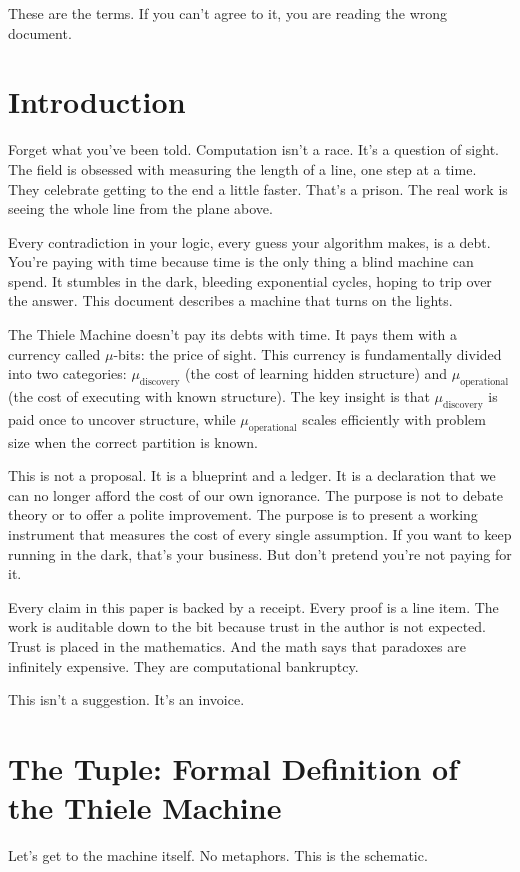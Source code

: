 \documentclass[11pt]{article}
\begin{document}
These are the terms. If you can't agree to it, you are reading the wrong document.

\section{Introduction}
Forget what you've been told. Computation isn't a race. It's a question of sight. The field is obsessed with measuring the length of a line, one step at a time. They celebrate getting to the end a little faster. That's a prison. The real work is seeing the whole line from the plane above.

Every contradiction in your logic, every guess your algorithm makes, is a debt. You're paying with time because time is the only thing a blind machine can spend. It stumbles in the dark, bleeding exponential cycles, hoping to trip over the answer. This document describes a machine that turns on the lights.

The Thiele Machine doesn't pay its debts with time. It pays them with a currency called $\mu$-bits: the price of sight. This currency is fundamentally divided into two categories: $\mu_{\text{discovery}}$ (the cost of learning hidden structure) and $\mu_{\text{operational}}$ (the cost of executing with known structure). The key insight is that $\mu_{\text{discovery}}$ is paid once to uncover structure, while $\mu_{\text{operational}}$ scales efficiently with problem size when the correct partition is known.

This is not a proposal. It is a blueprint and a ledger. It is a declaration that we can no longer afford the cost of our own ignorance. The purpose is not to debate theory or to offer a polite improvement. The purpose is to present a working instrument that measures the cost of every single assumption. If you want to keep running in the dark, that's your business. But don't pretend you're not paying for it.

Every claim in this paper is backed by a receipt. Every proof is a line item. The work is auditable down to the bit because trust in the author is not expected. Trust is placed in the mathematics. And the math says that paradoxes are infinitely expensive. They are computational bankruptcy.

This isn't a suggestion. It's an invoice.

\section{The Tuple: Formal Definition of the Thiele Machine}
Let’s get to the machine itself. No metaphors. This is the schematic.
\end{document}
